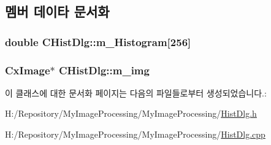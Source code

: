 \subsection{멤버 데이타 문서화}
\hypertarget{class_c_hist_dlg_a6c2d395cebef6f871fd1791fa57b6f55}{
\subsubsection[{m\-\_\-\-Histogram}]{\setlength{\rightskip}{0pt plus 5cm}double C\-Hist\-Dlg\-::m\-\_\-\-Histogram\mbox{[}256\mbox{]}\hspace{0.3cm}{\ttfamily [private]}}}\label{class_c_hist_dlg_a6c2d395cebef6f871fd1791fa57b6f55}
\hypertarget{class_c_hist_dlg_a931451fed18d5abe289575cecc8e9f54}{
\subsubsection[{m\-\_\-img}]{\setlength{\rightskip}{0pt plus 5cm}Cx\-Image$\ast$ C\-Hist\-Dlg\-::m\-\_\-img\hspace{0.3cm}{\ttfamily [private]}}}\label{class_c_hist_dlg_a931451fed18d5abe289575cecc8e9f54}


이 클래스에 대한 문서화 페이지는 다음의 파일들로부터 생성되었습니다.\-:\begin{DoxyCompactItemize}
\item 
H\-:/\-Repository/\-My\-Image\-Processing/\-My\-Image\-Processing/\hyperlink{_hist_dlg_8h}{Hist\-Dlg.\-h}\item 
H\-:/\-Repository/\-My\-Image\-Processing/\-My\-Image\-Processing/\hyperlink{_hist_dlg_8cpp}{Hist\-Dlg.\-cpp}\end{DoxyCompactItemize}

